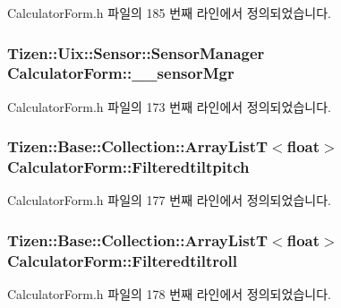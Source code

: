 Calculator\+Form.\+h 파일의 185 번째 라인에서 정의되었습니다.

\hypertarget{class_calculator_form_abb49d4c96119ee3adaf6a9bf8302ddaa}{
\subsubsection[{\+\_\+\+\_\+sensor\+Mgr}]{\setlength{\rightskip}{0pt plus 5cm}Tizen\+::\+Uix\+::\+Sensor\+::\+Sensor\+Manager Calculator\+Form\+::\+\_\+\+\_\+sensor\+Mgr\hspace{0.3cm}{\ttfamily [protected]}}}\label{class_calculator_form_abb49d4c96119ee3adaf6a9bf8302ddaa}


Calculator\+Form.\+h 파일의 173 번째 라인에서 정의되었습니다.

\hypertarget{class_calculator_form_a54065fa7531b14c744c8d11ccd849f81}{
\subsubsection[{Filteredtiltpitch}]{\setlength{\rightskip}{0pt plus 5cm}Tizen\+::\+Base\+::\+Collection\+::\+Array\+List\+T$<$float$>$ Calculator\+Form\+::\+Filteredtiltpitch\hspace{0.3cm}{\ttfamily [protected]}}}\label{class_calculator_form_a54065fa7531b14c744c8d11ccd849f81}


Calculator\+Form.\+h 파일의 177 번째 라인에서 정의되었습니다.

\hypertarget{class_calculator_form_a63438d1ef5396e2d216eaf604659c96c}{
\subsubsection[{Filteredtiltroll}]{\setlength{\rightskip}{0pt plus 5cm}Tizen\+::\+Base\+::\+Collection\+::\+Array\+List\+T$<$float$>$ Calculator\+Form\+::\+Filteredtiltroll\hspace{0.3cm}{\ttfamily [protected]}}}\label{class_calculator_form_a63438d1ef5396e2d216eaf604659c96c}


Calculator\+Form.\+h 파일의 178 번째 라인에서 정의되었습니다.


